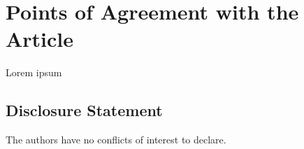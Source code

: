 \documentclass[]{hdsr}
\begin{document}
\restoregeometry
{}

\section{Points of Agreement with the Article}
Lorem ipsum 




\subsection*{Disclosure Statement}
The authors have no conflicts of interest to declare.


 










\printbibliography
\end{document}
